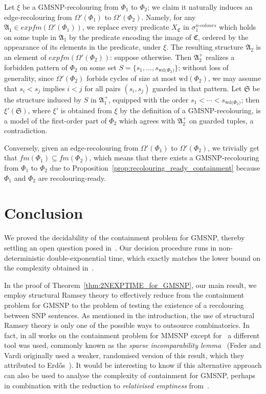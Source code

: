 \documentclass[oneside,reqno,12pt]{amsart}
\theoremstyle{plain}
\theoremstyle{remark}
\newcommand{\struct}[1]{\mathfrak{#1}}
\newcommand{\fm}{\ensuremath{\mathit{fm}}\xspace}
\newcommand{\efm}{\ensuremath{\mathit{expfm}}\xspace}
\newcommand{\wh}{\ensuremath{\mathrm{wd}}\xspace}
\begin{document}
{Let $\xi$ be a GMSNP-recolouring from $\Phi_1$ to $\Phi_2$; we claim it naturally induces an edge-recolouring from $\Omega'(\Phi_1)$ to $\Omega'(\Phi_2)$. Namely, for any  $\struct A_1\in \efm{(\Omega'(\Phi_1))}$,  we replace every predicate $X_{\struct C}$ in $\sigma_1^{\textit{n-colours}}$ which holds on some tuple in $\struct A_1$ by the predicate encoding the image of $\struct C$, ordered by the appearance of its elements in the predicate, under $\xi$. The resulting structure $\struct A_2$ is an element of $\efm{(\Omega'(\Phi_2))}$: suppose otherwise. Then $\struct A_2^+$ realizes  a forbidden pattern of $\Phi_2$ on some set $S=\{s_1,\ldots,s_{\wh{(\Phi_2})}\}$; without loss of generality, since $\Omega'(\Phi_2)$ forbids cycles of size at most $\wh(\Phi_2)$, we may assume that $s_i<s_j$ implies $i<j$ for all pairs $(s_i,s_j)$ guarded in that pattern. Let $\struct S$ be the structure induced by $S$ in $\struct A_1^+$, equipped with the order $s_1<\cdots<s_{\wh{(\Phi_2})}$; then $\xi'(\struct S)$, where $\xi'$ is obtained from $\xi$ by the definition of a GMSNP-recolouring, is a model of the first-order part of $\Phi_2$ which agrees with $\struct A_2^+$ on guarded tuples, a contradiction.

 Conversely,  given an edge-recolouring from $\Omega'(\Phi_1)$ to $\Omega'(\Phi_2)$, we trivially get that $\fm(\Phi_1)\subseteq \fm(\Phi_2)$, which means that there exists a GMSNP-recolouring from $\Phi_1$ to $\Phi_2$ due to Proposition~\ref{prop:recolouring_ready_containment} because $\Phi_1$ and $\Phi_2$ are recolouring-ready. 


 

\section{Conclusion}

We proved the decidability of the containment problem for GMSNP, thereby  settling an open question posed in~\cite{bienvenu2014,bouhris_lutz2016}.
Our decision procedure runs in non-deterministic double-exponential time, which exactly matches the lower bound on the complexity obtained in~\cite{bouhris_lutz2016}.
 

In the proof of Theorem~\ref{thm:2NEXPTIME_for_GMSNP}, our main result, we employ structural Ramsey theory to effectively reduce from the containment problem for GMSNP to the problem of testing the existence of a recolouring between SNP sentences.
As mentioned in the introduction, the use of structural Ramsey theory is only one of the possible ways to outsource combinatorics.
In fact, in all works on the containment problem for MMSNP except for~\cite{bodirsky2018_article} a different tool was used, 
commonly known as the \emph{sparse incomparability lemma}~\cite[Theorem~1]{kun2013} (Feder and Vardi originally used a weaker, randomised version of this result, which they attributed to Erd\H{o}s~\cite[Theorem~5]{federvardi1998}). 
It would be interesting to know if this alternative approach can also be used to analyse the complexity of containment for GMSNP, perhaps in combination with the reduction to \emph{relativised emptiness} from~\cite{bouhris_lutz2016}. 

}
\end{document}

